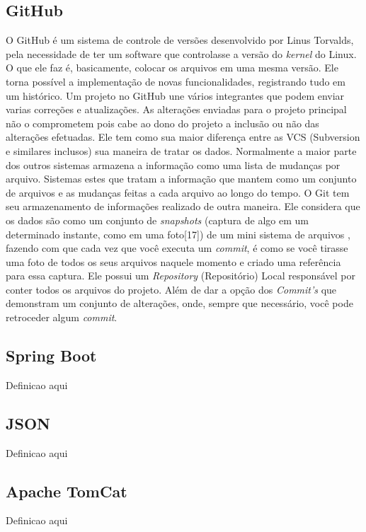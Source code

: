 \documentclass[12pt]{article}
\begin{document}
\subsection{GitHub}
	O GitHub é um sistema de controle de versões desenvolvido por Linus Torvalds, pela necessidade de ter um software que controlasse a versão do \textit{kernel} do Linux. O que ele faz é, basicamente, colocar os arquivos em uma mesma versão. 
	Ele torna possível a implementação de novas  funcionalidades, registrando tudo em um histórico. 
	Um projeto no GitHub une vários integrantes que podem enviar varias correções e atualizações. As alterações enviadas para o projeto principal não o comprometem pois cabe ao dono do projeto a inclusão ou não das alterações efetuadas. 
	Ele tem como sua maior diferença entre as VCS (Subversion e similares inclusos) sua maneira de tratar os dados. Normalmente a maior parte dos outros sistemas armazena a informação como uma lista de mudanças por arquivo. Sistemas estes que tratam a informação que mantem como um conjunto de arquivos e as mudanças feitas a cada arquivo ao longo do tempo.
	O Git tem seu armazenamento de informações realizado de outra maneira. Ele considera que os dados são como um conjunto de \textit{snapshots} (captura de algo em um determinado instante, como em uma foto[17]) de um mini sistema de arquivos , fazendo com que cada vez que você executa um \textit{commit}, é como se você tirasse uma foto de todos os seus arquivos naquele momento e criado uma referência para essa captura.
	Ele possui um \textit{Repository} (Repositório) Local responsável por conter todos os arquivos do projeto. Além de dar a opção dos \textit{Commit’s} que demonstram um conjunto de alterações, onde, sempre que necessário, você pode retroceder algum \textit{commit}.
\subsection{Spring Boot}
	Definicao aqui
\subsection{JSON}
	Definicao aqui
\subsection{Apache TomCat}
	Definicao aqui
\end{document}
